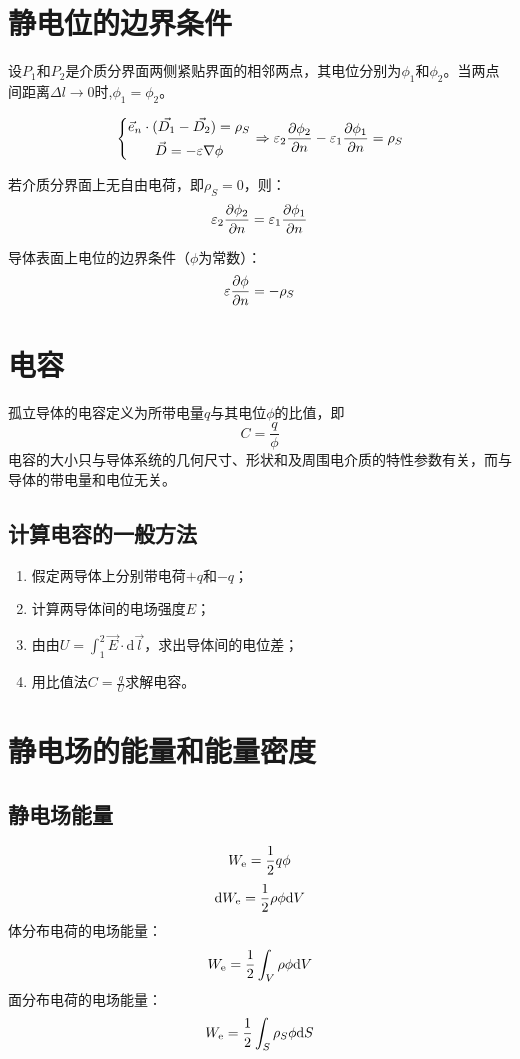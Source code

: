 \section{静电位的边界条件}
设$P_1$和$P_2$是介质分界面两侧紧贴界面的相邻两点，其电位分别为$\phi_1$和$\phi_2$。当两点间距离$\Delta l \to 0$时,$\phi_1 = \phi_2$。

$$\left\{
\begin{gathered}
\vec{e}_n \cdot (\vec{D_1} - \vec{D_2}) = \rho_S \\
\vec{D} = -\varepsilon\nabla\phi
\end{gathered}
\right. \Rightarrow {\varepsilon _2}{{\partial {\phi _2}} \over {\partial n}} - {\varepsilon _1}{{\partial {\phi _1}} \over {\partial n}} = {\rho _S}$$

若介质分界面上无自由电荷，即$\rho_S = 0$，则：
$${\varepsilon _2}{{\partial {\phi _2}} \over {\partial n}} = {\varepsilon _1}{{\partial {\phi _1}} \over {\partial n}}$$

导体表面上电位的边界条件（$\phi$为常数）：$$\varepsilon {{\partial \phi } \over {\partial n}} =  - {\rho _S}$$

\section{电容}
孤立导体的电容定义为所带电量$q$与其电位$\phi$的比值，即
$$C = \frac{q}{\phi}$$
电容的大小只与导体系统的几何尺寸、形状和及周围电介质的特性参数有关，而与导体的带电量和电位无关。

\subsection*{计算电容的一般方法}
\begin{enumerate}
	\item 假定两导体上分别带电荷$+q$和$-q$；
	\item 计算两导体间的电场强度$E$；
	\item 由由$U = \int^2_1\vec{E}\cdot\mathrm{d}\vec{l}$，求出导体间的电位差；
	\item 用比值法$C = \frac{q}{U}$求解电容。
\end{enumerate}

\section{静电场的能量和能量密度}
\subsection*{静电场能量}
$${W_{\rm{e}}} = {1 \over 2}q\phi $$
$${\rm{d}}{W_{\rm{e}}} = {1 \over 2}\rho \phi {\rm{d}}V$$
体分布电荷的电场能量：
$${W_{\rm{e}}} = {1 \over 2}\int_V {\rho \phi {\rm{d}}V} $$
面分布电荷的电场能量：
$${W_{\rm{e}}} = {1 \over 2}\int_S {{\rho _S}\phi {\rm{d}}S} $$

